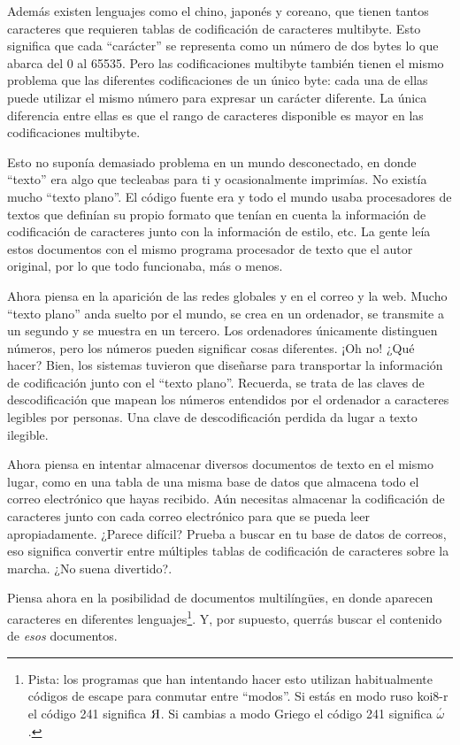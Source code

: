 Además existen lenguajes como el chino, japonés y coreano, que tienen tantos caracteres que requieren tablas de codificación de caracteres multibyte. Esto significa que cada ``carácter'' se representa como un número de dos bytes lo que abarca del 0 al 65535. Pero las codificaciones multibyte también tienen el mismo problema que las diferentes codificaciones de un único byte: cada una de ellas puede utilizar el mismo número para expresar un carácter diferente. La única diferencia entre ellas es que el rango de caracteres disponible es mayor en las codificaciones multibyte.

Esto no suponía demasiado problema en un mundo desconectado, en donde ``texto'' era algo que tecleabas para ti y ocasionalmente imprimías. No existía mucho ``texto plano''. El código fuente era  y todo el mundo usaba procesadores de textos que definían su propio formato que tenían en cuenta la información de codificación de caracteres junto con la información de estilo, etc. La gente leía estos documentos con el mismo programa procesador de texto que el autor original, por lo que todo funcionaba, más o menos.

Ahora piensa en la aparición de las redes globales y en el correo y la web. Mucho ``texto plano'' anda suelto por el mundo, se crea en un ordenador, se transmite a un segundo y se muestra en un tercero. Los ordenadores únicamente distinguen números, pero los números pueden significar cosas diferentes. ¡Oh no! ¿Qué hacer? Bien, los sistemas tuvieron que diseñarse para transportar la información de codificación junto con el ``texto plano''. Recuerda, se trata de las claves de descodificación que mapean los números entendidos por el ordenador a caracteres legibles por personas. Una clave de descodificación perdida da lugar a texto ilegible.

Ahora piensa en intentar almacenar diversos documentos de texto en el mismo lugar, como en una tabla de una misma base de datos que almacena todo el correo electrónico que hayas recibido. Aún necesitas almacenar la codificación de caracteres junto con cada correo electrónico para que se pueda leer apropiadamente. ¿Parece difícil? Prueba a buscar en tu base de datos de correos, eso significa convertir entre múltiples tablas de codificación de caracteres sobre la marcha. ¿No suena divertido?.

Piensa ahora en la posibilidad de documentos multilíngües, en donde aparecen caracteres en diferentes lenguajes\footnote{Pista: los programas que han intentando hacer esto utilizan habitualmente códigos de escape para conmutar entre ``modos''. Si estás en modo ruso koi8-r el código 241 significa $\reflectbox{R}$. Si cambias a modo Griego el código 241 significa $\stackrel{'}{\omega}$.}. Y, por supuesto, querrás buscar el contenido de \emph{esos} documentos.

